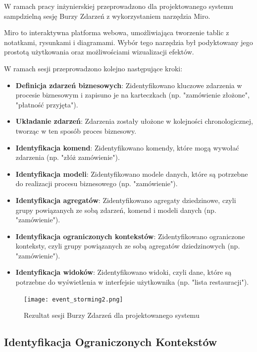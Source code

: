 W ramach pracy inżynierskiej przeprowadzono dla projektowanego systemu sampdzielną sesję Burzy Zdarzeń z wykorzystaniem narzędzia Miro.

Miro \cite{miro} to interaktywna platforma webowa, umożliwiająca tworzenie tablic z notatkami, rysunkami i diagramami. Wybór tego narzędzia był podyktowany jego prostotą użytkowania oraz możliwościami wizualizacji efektów.

W ramach sesji przeprowadzono kolejno następujące kroki:

\begin{itemize}

    \item \textbf{Definicja zdarzeń biznesowych}: Zidentyfikowano kluczowe zdarzenia w procesie biznesowym i zapisuno je na karteczkach (np. "zamówienie złożone", "płatność przyjęta").
    \item \textbf{Układanie zdarzeń}: Zdarzenia zostały ułożone w kolejności chronologicznej, tworząc w ten sposób proces biznesowy.
    \item \textbf{Identyfikacja komend}: Zidentyfikowano komendy, które mogą wywołać zdarzenia (np. "złóż zamówienie").
    \item \textbf{Identyfikacja modeli}: Zidentyfikowano modele danych, które są potrzebne do realizacji procesu biznesowego (np. "zamówienie").
    \item \textbf{Identyfikacja agregatów}: Zidentyfikowano agregaty dziedzinowe, czyli grupy powiązanych ze sobą zdarzeń, komend i modeli danych (np. "zamówienie").
    \item \textbf{Identyfikacja ograniczonych kontekstów}: Zidentyfikowano ograniczone konteksty, czyli grupy powiązanych ze sobą agregatów dziedzinowych (np. "zamówienie").
    \item \textbf{Identyfikacja widoków}: Zidentyfikowano widoki, czyli dane, które są potrzebne do wyświetlenia w interfejsie użytkownika (np. "lista restauracji").

\end{itemize}

\begin{figure}[!h]
    \centering \texttt{[image: event\_storming2.png]}
    \caption{Rezultat sesji Burzy Zdarzeń dla projektowanego systemu}
\end{figure}

\subsection{Identyfikacja Ograniczonych Kontekstów}

